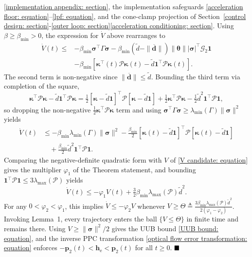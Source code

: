 \documentclass{IEEEtaes}
\begin{document}
\ref{implementation appendix: section}, the implementation safeguards \eqref{acceleration floor: equation}--\eqref{lpf: equation}, and the cone-clamp projection of Section~\ref{control design: section}-\ref{outer loop: section}\ref{acceleration conditioning: section}. Using $\beta\ge\beta_{\min}>0$, the expression for $\dot{V}$ above rearranges to
\begin{align*}
\dot{V}(t)\le& -\beta_{\min}\boldsymbol{\sigma}^\top\Gamma\boldsymbol{\sigma} - \beta_{\min}(\tilde{d}-\|\boldsymbol{\overline{d}}\|)\|\boldsymbol{\theta}\||\boldsymbol{\sigma}|^\top\mathcal{G}_2\boldsymbol{1}\\
&- \beta_{\min}[\boldsymbol{\kappa}^\top(t)\mathcal{P}\boldsymbol{\kappa}(t) - \tilde{d}\boldsymbol{1}^\top\mathcal{P}\boldsymbol{\kappa}(t)].
\end{align*}
The second term is non-negative since $\|\boldsymbol{\overline{d}}\|\le\tilde{d}$. Bounding the third term via completion of the square,
\begin{equation*}
    \boldsymbol{\kappa}^\top\mathcal{P}\boldsymbol{\kappa} - \tilde{d}\boldsymbol{1}^\top\mathcal{P}\boldsymbol{\kappa} = \tfrac12[\boldsymbol{\kappa}-\tilde{d}\boldsymbol{1}]^\top\mathcal{P}[\boldsymbol{\kappa}-\tilde{d}\boldsymbol{1}] + \tfrac12\boldsymbol{\kappa}^\top\mathcal{P}\boldsymbol{\kappa} - \tfrac12\tilde{d}^2\boldsymbol{1}^\top\mathcal{P}\boldsymbol{1},
\end{equation*}
so dropping the non-negative $\tfrac12\boldsymbol{\kappa}^\top\mathcal{P}\boldsymbol{\kappa}$ term and using $\boldsymbol{\sigma}^\top\Gamma\boldsymbol{\sigma}\ge\lambda_{\min}(\Gamma)\|\boldsymbol{\sigma}\|^2$ yields
\begin{align*}
\dot{V}(t)&\le -\beta_{\min}\lambda_{\min}(\Gamma)\|\boldsymbol{\sigma}\|^2 - \tfrac{\beta_{\min}}{2}[\boldsymbol{\kappa}(t)-\tilde{d}\boldsymbol{1}]^\top\mathcal{P}[\boldsymbol{\kappa}(t)-\tilde{d}\boldsymbol{1}]\\
&\quad + \tfrac{\beta_{\min}}{2}\tilde{d}^2\boldsymbol{1}^\top\mathcal{P}\boldsymbol{1}.
\end{align*}
Comparing the negative-definite quadratic form with $V$ of \eqref{V candidate: equation} gives the multiplier $\varphi_1$ of the Theorem statement, and bounding $\boldsymbol{1}^\top\mathcal{P}\boldsymbol{1}\le 3\lambda_{\max}(\mathcal{P})$ yields
\begin{equation} \label{Vdot bound: equation}
    \dot{V}(t)\le -\varphi_1 V(t) + \tfrac32\beta_{\min}\lambda_{\max}(\mathcal{P})\tilde{d}^2.
\end{equation}
For any $0<\varphi_2<\varphi_1$, this implies $\dot{V}\le-\varphi_2 V$ whenever $V\ge\Theta\triangleq \tfrac{3\beta_{\min}\lambda_{\max}(\mathcal{P})\tilde{d}^2}{2(\varphi_1-\varphi_2)}$. Invoking Lemma~1, every trajectory enters the ball $\{V\le\Theta\}$ in finite time and remains there. Using $V\ge\|\boldsymbol{\sigma}\|^2/2$ gives the UUB bound \eqref{UUB bound: equation}, and the inverse PPC transformation \eqref{optical flow error transformation: equation} enforces $-\boldsymbol{p}_2(t)<\boldsymbol{h}_\text{e}<\boldsymbol{p}_2(t)$ for all $t\ge 0$. $\hfill\blacksquare$
\end{document}
